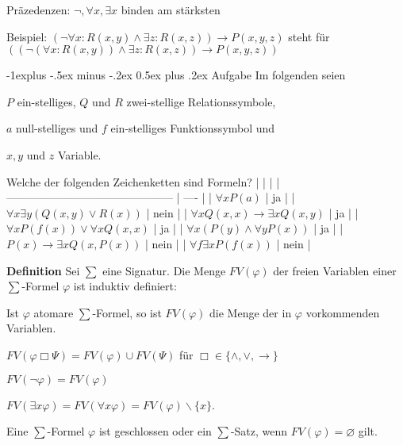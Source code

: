 \documentclass[a4paper]{article}
\makeatletter
\renewcommand{\note}[2]{\begin{noteBox} \textbf{#1} #2 \end{noteBox}}
\renewcommand{\subsection}{\@startsection{subsection}{2}{0mm}%
                {-1explus -.5ex minus -.2ex}%
                {0.5ex plus .2ex}%
                {\normalfont\normalsize\bfseries}}
\makeatother
\begin{document}
\begin{multicols}{3}
  Präzedenzen: $\lnot,\forall x,\exists x$ binden am stärksten

  Beispiel: $(\lnot\forall x:R(x,y)\wedge\exists z:R(x,z))\rightarrow P(x,y,z)$ steht für $((\lnot(\forall x:R(x,y))\wedge\exists z:R(x,z))\rightarrow P(x,y,z))$

  \subsection{Aufgabe}
  Im folgenden seien
  \begin{itemize*}
    \item $P$ ein-stelliges, $Q$ und $R$ zwei-stellige Relationssymbole,
    \item $a$ null-stelliges und $f$ ein-stelliges Funktionssymbol und
    \item $x,y$ und $z$ Variable.
  \end{itemize*}

  Welche der folgenden Zeichenketten sind Formeln?
  |                                               |      |
  | --------------------------------------------- | ---- |
  | $\forall x P(a)$                              | ja   |
  | $\forall x\exists y(Q(x,y)\vee R(x))$         | nein |
  | $\forall x Q(x,x)\rightarrow\exists x Q(x,y)$ | ja   |
  | $\forall x P(f(x))\vee\forall x Q(x,x)$      | ja   |
  | $\forall x(P(y)\wedge\forall y P(x))$         | ja   |
  | $P(x) \rightarrow\exists x Q(x,P(x))$         | nein |
  | $\forall f\exists x P(f(x))$                  | nein |

  \note{Definition}{Sei $\sum$ eine Signatur. Die Menge $FV(\varphi)$ der freien Variablen einer $\sum$-Formel $\varphi$ ist induktiv definiert:
    \begin{itemize*}
      \item Ist $\varphi$ atomare $\sum$-Formel, so ist $FV(\varphi)$ die Menge der in $\varphi$ vorkommenden Variablen.
      \item $FV(\varphi\Box\Psi) =FV(\varphi)\cup FV(\Psi)$ für $\Box\in\{\wedge,\vee,\rightarrow\}$
      \item $FV(\lnot\varphi) =FV(\varphi)$
      \item $FV(\exists x\varphi) =FV(\forall x\varphi) =FV(\varphi)\backslash\{x\}$.
    \end{itemize*}
    Eine $\sum$-Formel $\varphi$ ist geschlossen oder ein $\sum$-Satz, wenn $FV(\varphi)=\varnothing$ gilt.}


\end{multicols}
\end{document}
